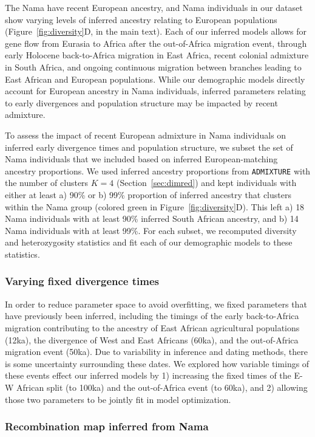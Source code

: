 \documentclass[]{article}
\begin{document}
The Nama have recent European ancestry, and Nama individuals in our dataset
show varying levels of inferred ancestry relating to European populations
(Figure~\ref{fig:diversity}D, in the main text). Each of our inferred models
allows for gene flow from Eurasia to Africa after the out-of-Africa migration
event, through early Holocene back-to-Africa migration in East Africa, recent
colonial admixture in South Africa, and ongoing continuous migration between
branches leading to East African and European populations. While our
demographic models directly account for European ancestry in Nama individuals,
inferred parameters relating to early divergences and population structure may
be impacted by recent admixture.

To assess the impact of recent European admixture in Nama individuals on
inferred early divergence times and population structure, we subset the set of
Nama individuals that we included based on inferred European-matching ancestry
proportions. We used inferred ancestry proportions from \texttt{ADMIXTURE} with
the number of clusters $K=4$ (Section~\ref{sec:dimred}) and kept individuals
with either at least a) 90\% or b) 99\% proportion of inferred ancestry that
clusters within the Nama group (colored green in Figure~\ref{fig:diversity}D).
This left a) 18 Nama individuals with at least 90\% inferred South African
ancestry, and b) 14 Nama individuals with at least 99\%. For each subset, we
recomputed diversity and heterozygosity statistics and fit each of our
demographic models to these statistics.

\subsubsection{Varying fixed divergence times}
\label{sec:change_dates}
In order to reduce parameter space to avoid overfitting, we fixed parameters
that have previously been inferred, including the timings of the early
back-to-Africa migration contributing to the ancestry of East African
agricultural populations (12ka), the divergence of West and East Africans
(60ka), and the out-of-Africa migration event (50ka). Due to variability in
inference and dating methods, there is some uncertainty surrounding these
dates. We explored how variable timings of these events effect our inferred
models by 1) increasing the fixed times of the E-W African split (to 100ka) and
the out-of-Africa event (to 60ka), and 2) allowing those two parameters to be
jointly fit in model optimization.

\subsubsection{Recombination map inferred from Nama}
\end{document}
